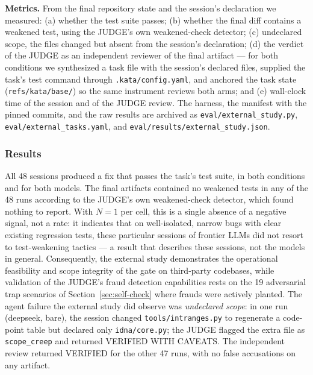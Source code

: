 \documentclass{sbc2019}%
\begin{document}
\textbf{Metrics.} From the final repository state and the session's
declaration we measured: (a) whether the test suite passes; (b) whether the
final diff contains a weakened test, using the JUDGE's own weakened-check
detector; (c) undeclared scope, the files changed but absent from the
session's declaration; (d) the verdict of the JUDGE as an independent
reviewer of the final artifact --- for both conditions we synthesized a
task file with the session's declared files, supplied the task's test
command through \texttt{.kata/config.yaml}, and anchored the task state
(\texttt{refs/kata/base/}) so the same instrument reviews both arms; and
(e) wall-clock time of the session and of the JUDGE review. The harness,
the manifest with the pinned commits, and the raw results are archived as
\texttt{eval/\allowbreak external\_study.py},
\texttt{eval/\allowbreak external\_tasks.yaml}, and
\texttt{eval/\allowbreak results/\allowbreak external\_study.json}.

\subsubsection{Results}

All 48 sessions produced a fix that passes the task's test suite, in both
conditions and for both models. The final artifacts contained no
weakened tests in any of the 48 runs according to the JUDGE's own
weakened-check detector, which found nothing to report. With $N=1$ per cell,
this is a single absence of a negative signal, not a rate: it indicates that
on well-isolated, narrow bugs with clear existing regression tests, these
particular sessions of frontier LLMs did not resort to
test-weakening tactics --- a result that describes these sessions, not the
models in general. Consequently, the external study demonstrates the operational
feasibility and scope integrity of the gate on third-party codebases, while
validation of the JUDGE's fraud detection capabilities rests on the 19 adversarial
trap scenarios of Section~\ref{sec:self-check} where frauds were actively planted.
The agent failure the external study did observe was
\emph{undeclared scope}: in one run (deepseek, bare), the session
changed \texttt{tools/intranges.py} to regenerate a code-point table but
declared only \texttt{idna/core.py}; the JUDGE flagged the extra file as
\texttt{scope\_creep} and returned VERIFIED WITH CAVEATS. The independent
review returned VERIFIED for the other 47 runs, with no false accusations
on any artifact.
\end{document}
